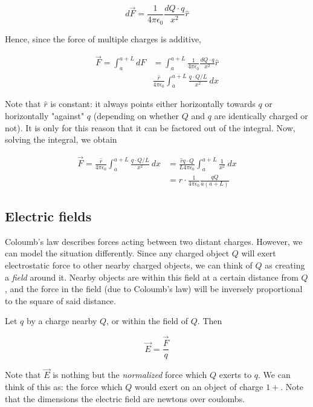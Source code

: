 \documentclass[12pt]{article}
\theoremstyle{definition}
\begin{document}
\begin{equation*}
    d\vec{F} = \frac{1}{4\pi\epsilon_0} \frac{dQ \cdot q}{x^2} \hat{r}
\end{equation*}

Hence, since the force of multiple charges is additive, 

\begin{align*}
    \vec{F} = \int_{a}^{a+L} dF 
    &= \int_a^{a+L}  \frac{1}{4\pi\epsilon_0} \frac{dQ \cdot q}{x^2} \hat{r}\\ 
    & \frac{\hat{r}}{4\pi\epsilon_0} \int_{a}^{a+L} \frac{q \cdot Q /L }{x^2} ~ dx
\end{align*}

Note that $\hat{r}$ is constant: it always points either horizontally towards
$q$ or horizontally "against" $q$ (depending on whether $Q$ and $q$ are
identically charged or not). It is only for this reason that it can be factored
out of the integral. Now, solving the integral, we obtain

\begin{align*}
    \vec{F} = \frac{\hat{r}}{4\pi\epsilon_0} \int_{a}^{a+L} \frac{q \cdot Q /L }{x^2} ~ dx
    &= \frac{\hat{r} q \cdot Q}{L 4 \pi \epsilon_0} \int_{a}^{a+L} \frac{1}{x^2}
    ~ dx \\
    &= \hat{r} \cdot \frac{1}{4\pi \epsilon_0} \frac{qQ}{a(a+L)}
\end{align*}




\subsection{Electric fields}

Coloumb's law describes forces acting between two distant charges. However, we
can model the situation differently. Since any charged object $Q$ will exert
electrostatic force to other nearby charged objects, we can think of $Q$ as
creating a \textit{field} around it. Nearby objects are within this field at a
certain distance from $Q$, and the force in the field (due to Coloumb's law)
will be inversely proportional to the square of said distance.

Let $q$ by a charge nearby $Q$, or within the field of $Q$. Then

\begin{equation}\tag{Electric field}
    \vec{E} = \frac{\vec{F}}{q}
\end{equation}

Note that $\vec{E}$ is nothing but the \textit{normalized} force which $Q$
exerts to $q$. We can think of this as: the force which $Q$ would exert on an
object of charge $1+$. Note that the dimensions the electric field are newtons
over coulombs.
\end{document}
